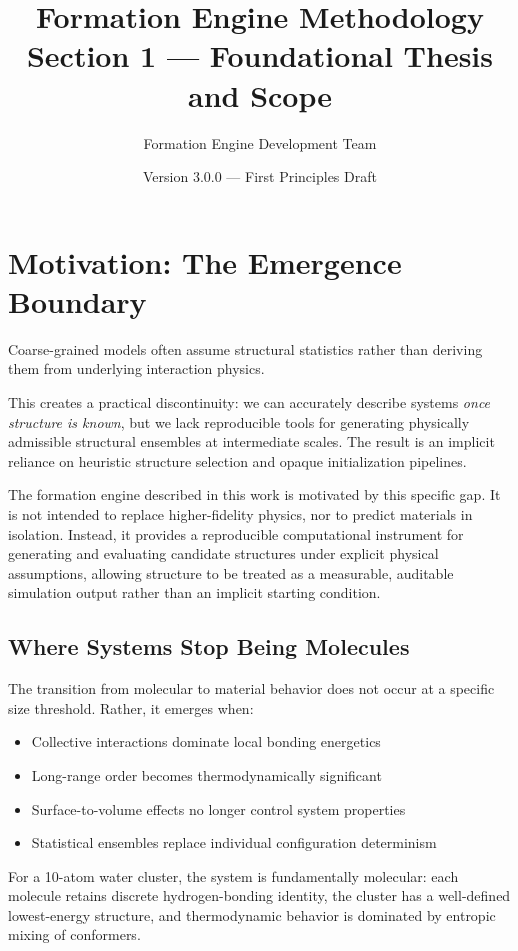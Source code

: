 \documentclass[11pt]{article}
\title{\textbf{Formation Engine Methodology} \\
\Large Section 1 — Foundational Thesis and Scope}
\author{Formation Engine Development Team}
\date{Version 3.0.0 — First Principles Draft}
\begin{document}
\maketitle

\section{Motivation: The Emergence Boundary}

Coarse-grained models often assume structural statistics rather than deriving them from underlying interaction physics.

This creates a practical discontinuity: we can accurately describe systems \textit{once structure is known}, but we lack reproducible tools for generating physically admissible structural ensembles at intermediate scales. The result is an implicit reliance on heuristic structure selection and opaque initialization pipelines.

The formation engine described in this work is motivated by this specific gap. It is not intended to replace higher-fidelity physics, nor to predict materials in isolation. Instead, it provides a reproducible computational instrument for generating and evaluating candidate structures under explicit physical assumptions, allowing structure to be treated as a measurable, auditable simulation output rather than an implicit starting condition.

\subsection{Where Systems Stop Being Molecules}

The transition from molecular to material behavior does not occur at a specific size threshold. Rather, it emerges when:

\begin{itemize}
\item Collective interactions dominate local bonding energetics
\item Long-range order becomes thermodynamically significant
\item Surface-to-volume effects no longer control system properties
\item Statistical ensembles replace individual configuration determinism
\end{itemize}

For a 10-atom water cluster, the system is fundamentally molecular: each molecule retains discrete hydrogen-bonding identity, the cluster has a well-defined lowest-energy structure, and thermodynamic behavior is dominated by entropic mixing of conformers.
\end{document}
